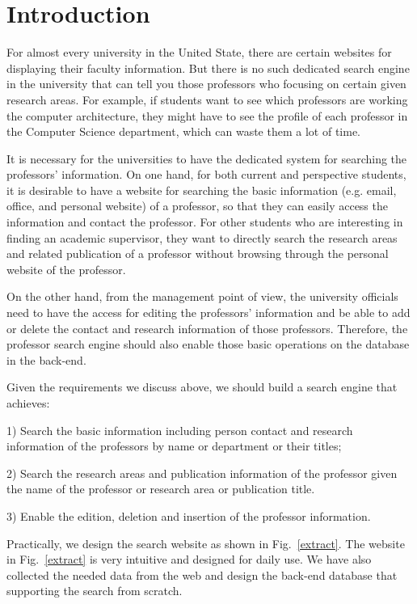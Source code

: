 \documentclass[authoryear,preprint,final,12pt]{elsarticle}
\begin{document}

\section{Introduction}
For almost every university in the United State, there are certain websites for displaying their faculty information. But there is no such dedicated search engine in the university that can tell you those professors who focusing on certain given research areas. For example, if students want to see which professors are working the computer architecture, they might have to see the profile of each professor in the Computer Science department, which can waste them a lot of time. 

It is necessary for the universities to have the dedicated system for searching the  professors' information. On one hand, for both current and perspective students, it is desirable to have a website for searching the basic information (e.g. email, office, and personal website) of a professor, so that they can easily access the information and contact the professor. For other students who are interesting in finding an academic supervisor, they want to directly search the research areas and related publication of a professor without browsing through the personal website of the professor.

On the other hand, from the management point of view, the university officials need to have the access for editing the professors' information and be able to add or delete the contact and research information of those professors. Therefore, the professor search engine should also enable those basic operations on the database in the back-end. 

Given the requirements we discuss above, we should build a search engine that achieves:

1) Search the basic information including person contact and research information of the professors by name or department or their titles;

2) Search the research areas and publication information of the professor given the name of the professor or research area or publication title.

3) Enable the edition, deletion and insertion of the professor information. 

Practically, we design the search website as shown in Fig.~\ref{extract}. The website in Fig.~\ref{extract} is very intuitive and designed for daily use. We have also collected the needed data from the web and design the back-end database that supporting the search from scratch.
\end{document}
